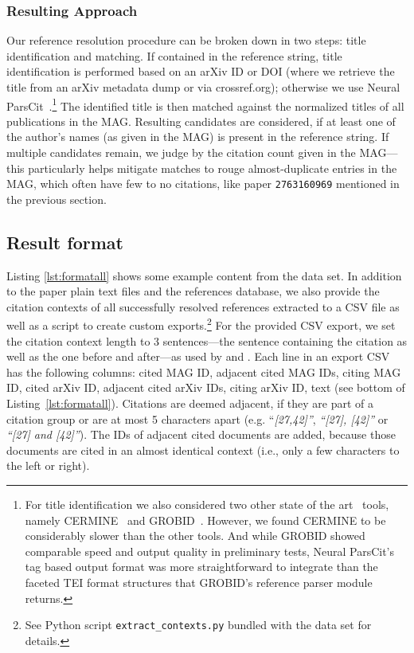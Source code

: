 \subsubsection{Resulting Approach}
Our reference resolution procedure can be broken down in two steps: title identification and matching. If contained in the reference string, title identification is performed based on an arXiv ID or DOI (where we retrieve the title from an arXiv metadata dump or via crossref.org); otherwise we use Neural ParsCit~\cite{neuralparscit}.\footnote{For title identification we also considered two other state of the art~\cite{Tkaczyk2018} tools, namely  CERMINE~\cite{Tkaczyk2015} and GROBID~\cite{Lopez2009}. However, we found CERMINE to be considerably slower than the other tools. And while GROBID showed comparable speed and output quality in preliminary tests, Neural ParsCit's tag based output format was more straightforward to integrate than the faceted TEI format structures that GROBID's reference parser module returns.}
The identified title is then matched against the normalized titles of all publications in the MAG. Resulting candidates are considered, if at least one of the author's names (as given in the MAG) is present in the reference string. If multiple candidates remain, we judge by the citation count given in the MAG---this particularly helps mitigate matches to rouge almost-duplicate entries in the MAG, which often have few to no citations, like paper \texttt{2763160969} mentioned in the previous section.

\subsection{Result format}
Listing \ref{lst:formatall} shows some example content from the data set. In addition to the paper plain text files and the references database, we also provide the citation contexts of all successfully resolved references extracted to a CSV file as well as a script to create custom exports.\footnote{See Python script \texttt{extract\_contexts.py} bundled with the data set for details.} For the provided CSV export, we set the citation context length to 3 sentences---the sentence containing the citation as well as the one before and after---as used by \cite{Tang2014} and \cite{Huang2015fixed}. Each line in an export CSV has the following columns: cited MAG ID, adjacent cited MAG IDs, citing MAG ID, cited arXiv ID, adjacent cited arXiv IDs, citing arXiv ID, text (see bottom of Listing~\ref{lst:formatall}). Citations are deemed adjacent, if they are part of a citation group or are at most 5 characters apart (e.g. ``\emph{[27,42]''}, \emph{``[27], [42]''} or \emph{``[27] and [42]''}). The IDs of adjacent cited documents are added, because those documents are cited in an almost identical context (i.e., only a few characters to the left or right).

